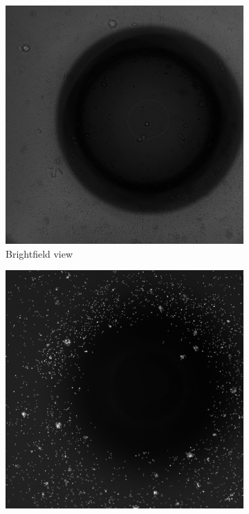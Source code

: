 \hfill\\
\hfill\\
\begin{figure}[h]
    \centering
    \begin{subfigure}[h!]{0.3\textwidth}
        \includegraphics[width=\textwidth]{dissertation/figures/faulty_brightfield.jpg}
        \caption{Brightfield view}
    \end{subfigure}
    \begin{subfigure}[h!]{0.3\textwidth}
        \includegraphics[width=\textwidth]{dissertation/figures/faulty_tcell.jpg}

\end{subfigure}
\end{figure}
